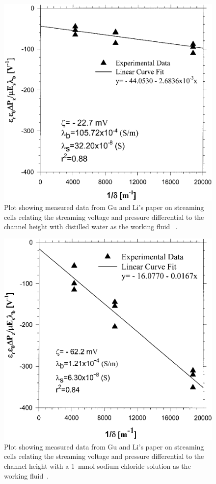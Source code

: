   \begin{figure}
      \centering
      \includegraphics{content/pt1/01-PowerHarvesting/graphics/GuLi_DIUF}
      \caption{\label{fig:Gu_Li_comparison_DUIF}Plot showing measured data from Gu and Li's paper on streaming cells relating the streaming voltage and pressure differential to the channel height with distilled water as the working fluid ~\cite{Gu2000}.}
  \end{figure}

  \begin{figure}
      \centering
      \includegraphics{content/pt1/01-PowerHarvesting/graphics/GuLi_NaCl}
      \caption{\label{fig:Gu_Li_comparison_NaCl}Plot showing measured data from Gu and Li's paper on streaming cells relating the streaming voltage and pressure differential to the channel height with a \SI{1}{\milli\mole} sodium chloride solution as the working fluid~\cite{Gu2000}.}
  \end{figure}

